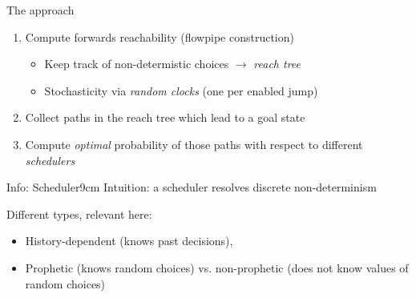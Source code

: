 \documentclass[aspectratio=169]{beamer}
\begin{document}

\begin{frame}{The approach}

  \begin{enumerate}
    \item Compute forwards reachability (flowpipe construction)
    \begin{itemize}
      \item Keep track of non-determistic choices $\rightarrow$ \emph{reach tree}
      \item Stochasticity via \emph{random clocks} (one per enabled jump)
    \end{itemize}
    \item Collect paths in the reach tree which lead to a goal state
    \item Compute \emph{optimal} probability of those paths with respect to different \emph{schedulers}
  \end{enumerate}

  \bigskip

  \centering
  \begin{reminder}{\scriptsize Info: Scheduler}{9cm}
    \tiny
    Intuition: a scheduler resolves discrete non-determinism

    Different types, relevant here:
    \begin{itemize}
      \item History-dependent (knows past decisions),
      \item Prophetic (knows random choices) vs. non-prophetic (does not know values of random choices)
    \end{itemize}
  \end{reminder}
\end{frame}

\end{document}
